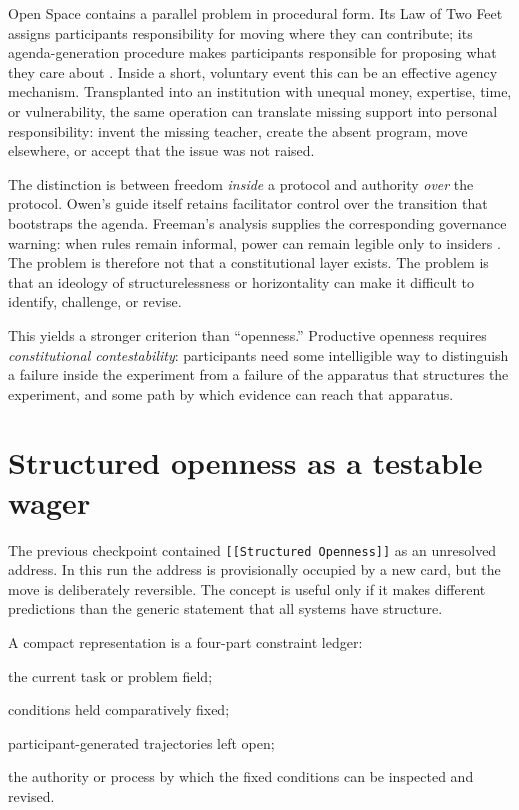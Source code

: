 \documentclass[11pt]{article}
\begin{document}
Open Space contains a parallel problem in procedural form. Its Law of Two Feet assigns participants responsibility for moving where they can contribute; its agenda-generation procedure makes participants responsible for proposing what they care about \cite{owen_open_space_guide}. Inside a short, voluntary event this can be an effective agency mechanism. Transplanted into an institution with unequal money, expertise, time, or vulnerability, the same operation can translate missing support into personal responsibility: invent the missing teacher, create the absent program, move elsewhere, or accept that the issue was not raised.

The distinction is between freedom \emph{inside} a protocol and authority \emph{over} the protocol. Owen's guide itself retains facilitator control over the transition that bootstraps the agenda. Freeman's analysis supplies the corresponding governance warning: when rules remain informal, power can remain legible only to insiders \cite{freeman1972tyranny}. The problem is therefore not that a constitutional layer exists. The problem is that an ideology of structurelessness or horizontality can make it difficult to identify, challenge, or revise.

This yields a stronger criterion than ``openness.'' Productive openness requires \emph{constitutional contestability}: participants need some intelligible way to distinguish a failure inside the experiment from a failure of the apparatus that structures the experiment, and some path by which evidence can reach that apparatus.

\section{Structured openness as a testable wager}
The previous checkpoint contained \texttt{[[Structured Openness]]} as an unresolved address. In this run the address is provisionally occupied by a new card, but the move is deliberately reversible. The concept is useful only if it makes different predictions than the generic statement that all systems have structure.

A compact representation is a four-part constraint ledger:

\begin{description}[leftmargin=1.1in]
\item[T] the current task or problem field;
\item[C] conditions held comparatively fixed;
\item[X] participant-generated trajectories left open;
\item[A] the authority or process by which the fixed conditions can be inspected and revised.
\end{description}
\end{document}
